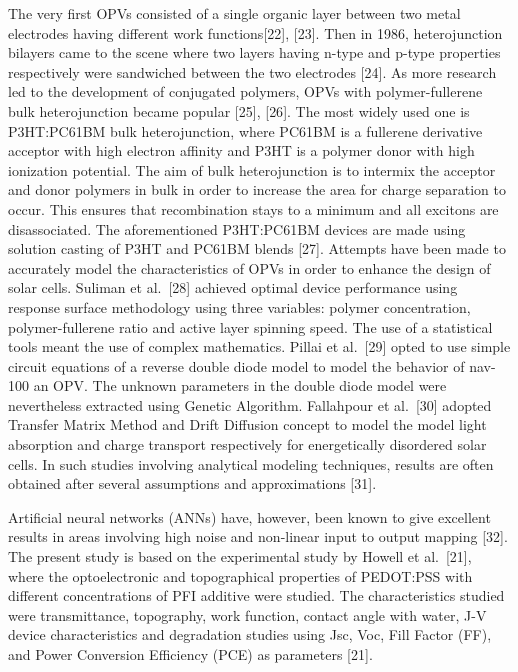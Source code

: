 \documentclass[]{article}
\begin{document}
The very first OPVs consisted of a single organic layer between two metal electrodes having different work functions{[}22{]}, {[}23{]}. Then in 1986, heterojunction bilayers came to the scene where two layers having n-type and p-type properties respectively were sandwiched between the two electrodes {[}24{]}. As more research led to the development of conjugated polymers, OPVs with polymer-fullerene bulk heterojunction became popular {[}25{]}, {[}26{]}. The most widely used one is P3HT:PC61BM bulk heterojunction, where PC61BM is a fullerene derivative acceptor with high electron affinity and P3HT is a polymer donor with high ionization potential. The aim of bulk heterojunction is to intermix the acceptor and donor polymers in bulk in order to increase the area for charge separation to occur. This ensures that recombination stays to a minimum and all excitons are disassociated. The aforementioned P3HT:PC61BM devices are made using solution casting of P3HT and PC61BM blends {[}27{]}.
Attempts have been made to accurately model the characteristics of OPVs in order to enhance the design of solar cells. Suliman et al.~{[}28{]} achieved optimal device performance using response surface methodology using three variables: polymer concentration, polymer-fullerene ratio and active layer spinning speed. The use of a statistical tools meant the use of complex mathematics. Pillai et al.~{[}29{]} opted to use simple circuit equations of a reverse double diode model to model the behavior of nav-100 an OPV. The unknown parameters in the double diode model were nevertheless extracted using Genetic Algorithm. Fallahpour et al.~{[}30{]} adopted Transfer Matrix Method and Drift Diffusion concept to model the model light absorption and charge transport respectively for energetically disordered solar cells. In such studies involving analytical modeling techniques, results are often obtained after several assumptions and approximations {[}31{]}.

Artificial neural networks (ANNs) have, however, been known to give excellent results in areas involving high noise and non-linear input to output mapping {[}32{]}. The present study is based on the experimental study by Howell et al.~{[}21{]}, where the optoelectronic and topographical properties of PEDOT:PSS with different concentrations of PFI additive were studied. The characteristics studied were transmittance, topography, work function, contact angle with water, J-V device characteristics and degradation studies using Jsc, Voc, Fill Factor (FF), and Power Conversion Efficiency (PCE) as parameters {[}21{]}.
\end{document}

